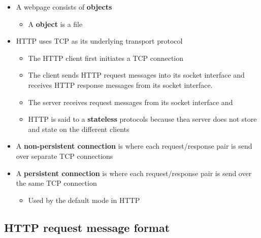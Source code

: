 \documentclass[11pt]{article}
\providecommand{\tightlist}{%
      \setlength{\itemsep}{0pt}\setlength{\parskip}{0pt}}
\begin{document}
\begin{itemize}
\tightlist
\item
  A webpage consists of \textbf{objects}

  \begin{itemize}
  \tightlist
  \item
    A \textbf{object} is a file
  \end{itemize}
\item
  HTTP uses TCP as its underlying transport protocol

  \begin{itemize}
  \tightlist
  \item
    The HTTP client first initiates a TCP connection
  \item
    The client sends HTTP request messages into its socket interface and
    receives HTTP response messages from its socket interface.
  \item
    The server receives request messages from its socket interface and
  \item
    HTTP is said to a \textbf{stateless} protocols because thea server
    does not store and state on the different clients
  \end{itemize}
\item
  A \textbf{non-persistent connection} is where each request/response
  pair is send over separate TCP connections
\item
  A \textbf{persistent connection} is where each request/response pair
  is send over the same TCP connection

  \begin{itemize}
  \tightlist
  \item
    Used by the default mode in HTTP
  \end{itemize}
\end{itemize}

    \subsection{HTTP request message
format}\label{http-request-message-format}
\end{document}
